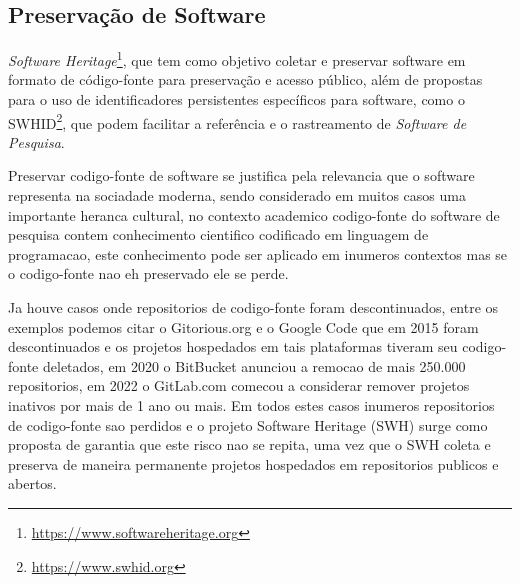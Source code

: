 

\subsection{Preservação de Software}

\textit{Software Heritage}\footnote{\url{https://www.softwareheritage.org}}, que tem como objetivo coletar e preservar software em formato de código-fonte para preservação e acesso público, além de propostas para o uso de identificadores persistentes específicos para software, como o SWHID\footnote{\url{https://www.swhid.org}}, que podem facilitar a referência e o rastreamento de \textit{Software de Pesquisa}.

Preservar codigo-fonte de software se justifica pela relevancia que o software representa na sociadade moderna, sendo considerado em muitos casos uma importante heranca cultural, no contexto academico codigo-fonte do software de pesquisa contem conhecimento cientifico codificado em linguagem de programacao, este conhecimento pode ser aplicado em inumeros contextos mas se o codigo-fonte nao eh preservado ele se perde.

Ja houve casos onde repositorios de codigo-fonte foram descontinuados, entre os exemplos podemos citar o Gitorious.org e o Google Code que em 2015 foram descontinuados e os projetos hospedados em tais plataformas tiveram seu codigo-fonte deletados, em   2020 o BitBucket anunciou a remocao de mais 250.000 repositorios, em 2022 o GitLab.com comecou a considerar remover projetos inativos por mais de 1 ano ou mais. Em todos estes casos inumeros repositorios de codigo-fonte sao perdidos e o projeto Software Heritage (SWH) surge como proposta de garantia que este risco nao se repita, uma vez que o SWH coleta e preserva de maneira permanente projetos hospedados em repositorios publicos e abertos.